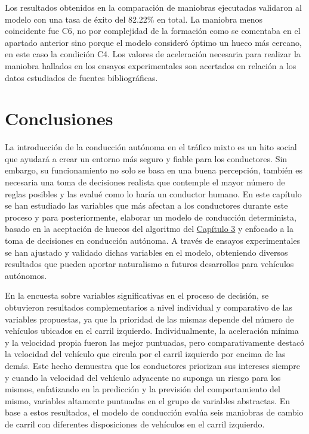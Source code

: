 Los resultados obtenidos en la comparación de maniobras ejecutadas validaron al modelo con una tasa de éxito del 82.22\% en total. La maniobra menos coincidente fue C6, no por complejidad de la formación como se comentaba en el apartado anterior sino porque el modelo consideró óptimo un hueco más cercano, en este caso la condición C4. Los valores de aceleración necesaria para realizar la maniobra hallados en los ensayos experimentales son acertados en relación a los datos estudiados de fuentes bibliográficas.  

\section{Conclusiones}  

La introducción de la conducción autónoma en el tráfico mixto es un hito social que ayudará a crear un entorno más seguro y fiable para los conductores. Sin embargo, su funcionamiento no solo se basa en una buena percepción, también es necesaria una toma de decisiones realista que contemple el mayor número de reglas posibles y las evalué como lo haría un conductor humano. En este capítulo se han estudiado las variables que más afectan a los conductores durante este proceso y para posteriormente, elaborar un modelo de conducción determinista, basado en la aceptación de huecos del algoritmo del \hyperref[ch3]{Capítulo 3} y enfocado a la toma de decisiones en conducción autónoma. A través de ensayos experimentales se han ajustado y validado dichas variables en el modelo, obteniendo diversos resultados que pueden aportar naturalismo a futuros desarrollos para vehículos autónomos. 

En la encuesta sobre variables significativas en el proceso de decisión, se obtuvieron resultados complementarios a nivel individual y comparativo de las variables propuestas, ya que la prioridad de las mismas depende del número de vehículos ubicados en el carril izquierdo. Individualmente, la aceleración mínima y la velocidad propia fueron las mejor puntuadas, pero comparativamente destacó la velocidad del vehículo que circula por el carril izquierdo por encima de las demás. Este hecho demuestra que los conductores priorizan sus intereses siempre y cuando la velocidad del vehículo adyacente no suponga un riesgo para los mismos, enfatizando en la predicción y la previsión del comportamiento del mismo, variables altamente puntuadas en el grupo de variables abstractas. En base a estos resultados, el modelo de conducción evalúa seis maniobras de cambio de carril con diferentes disposiciones de vehículos en el carril izquierdo.  

